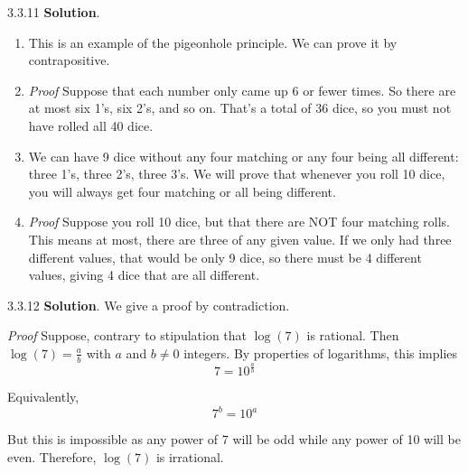 \documentclass[11pt,]{book}
\makeatletter
\theoremstyle{ptxplainnotitle}
\theoremstyle{ptxplaintitle}
\renewcommand*{\proofname}{Proof}
\renewenvironment{proof}[1][\proofname]{\par
  \pushQED{\qed}%
  \normalfont \topsep6\p@\@plus6\p@\relax
  \trivlist
  \item\relax
    {\itshape
    #1\@addpunct{.}}\hspace\labelsep\ignorespaces
}{%
  \popQED\endtrivlist\@endpefalse
}
\theoremstyle{ptxdefinitionnotitle}
\theoremstyle{ptxdefinitiontitle}
\theoremstyle{ptxdefinitionnotitle}
\theoremstyle{ptxdefinitiontitle}
\theoremstyle{ptxdefinitionnotitle}
\theoremstyle{ptxdefinitiontitle}
\theoremstyle{ptxdefinitiontitlenonumber}
\theoremstyle{ptxdefinitiontitlenonumber}
\numberwithin{equation}{chapter}
\makeatother
\begin{document}
\begin{divisionexercise}{3.3.11}
\textbf{Solution}.\quad%
\hypertarget{p-2508}{}%
\leavevmode%
\begin{enumerate}[label=(\alph*)]
\item\hypertarget{li-1258}{}\hypertarget{p-2509}{}%
This is an example of the pigeonhole principle. We can prove it by contrapositive.%
\begin{proof}\hypertarget{proof-35}{}
\hypertarget{p-2510}{}%
Suppose that each number only came up 6 or fewer times. So there are at most six 1's, six 2's, and so on. That's a total of 36 dice, so you must not have rolled all 40 dice.%
\end{proof}
\item\hypertarget{li-1259}{}\hypertarget{p-2511}{}%
We can have 9 dice without any four matching or any four being all different: three 1's, three 2's, three 3's. We will prove that whenever you roll 10 dice, you will always get four matching or all being different.%
\begin{proof}\hypertarget{proof-36}{}
\hypertarget{p-2512}{}%
Suppose you roll 10 dice, but that there are NOT four matching rolls. This means at most, there are three of any given value. If we only had three different values, that would be only 9 dice, so there must be 4 different values, giving 4 dice that are all different.%
\end{proof}
\end{enumerate}
%
\end{divisionexercise}%
\begin{divisionexercise}{3.3.12}
\textbf{Solution}.\quad%
\hypertarget{p-2514}{}%
We give a proof by contradiction.%
\begin{proof}\hypertarget{proof-37}{}
\hypertarget{p-2515}{}%
Suppose, contrary to stipulation that \(\log(7)\) is rational. Then \(\log(7) = \frac{a}{b}\) with \(a\) and \(b \ne 0\) integers. By properties of logarithms, this implies%
\begin{equation*}
7 = 10^{\frac{a}{b}}
\end{equation*}
%
\par
\hypertarget{p-2516}{}%
Equivalently,%
\begin{equation*}
7^b = 10^a
\end{equation*}
%
\par
\hypertarget{p-2517}{}%
But this is impossible as any power of 7 will be odd while any power of 10 will be even.  Therefore, \(\log(7)\) is irrational.%
\end{proof}
\end{divisionexercise}%
\end{document}
